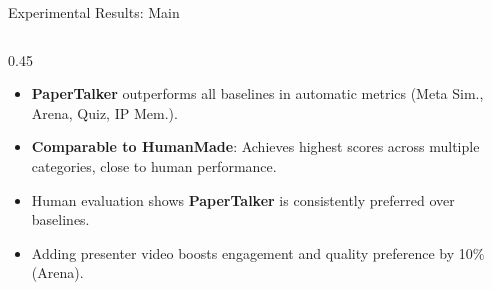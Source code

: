 \documentclass{beamer}
\newcommand{\alertterm}[1]{\alert{\textbf{#1}}}
\begin{document}
\begin{frame}{Experimental Results: Main}
\begin{columns}
    \hfill
    \begin{column}{0.45\linewidth}
      \small
      \begin{itemize}
        \item \alertterm{PaperTalker} outperforms all baselines in automatic metrics (Meta Sim., Arena, Quiz, IP Mem.).
        \item \alertterm{Comparable to HumanMade}: Achieves highest scores across multiple categories, close to human performance.
        \item Human evaluation shows \alertterm{PaperTalker} is consistently preferred over baselines.
        \item Adding presenter video boosts engagement and quality preference by 10\% (Arena).
      \end{itemize}
    \end{column}
  \end{columns}
\end{frame}
\end{document}
